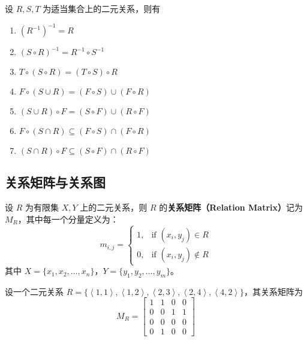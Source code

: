 \begin{proposition}
    设 $ R, S, T $ 为适当集合上的二元关系，则有
    \begin{enumerate}
        \item $ (R^{-1})^{-1} = R $
        \item $ (S\circ R)^{-1} = R^{-1}\circ S^{-1} $
        \item $ T\circ (S\circ R) = (T\circ S)\circ R $
        \item $ F\circ (S \cup R) = (F\circ S) \cup (F\circ R) $
        \item $ (S \cup R)\circ F = (S\circ F) \cup (R\circ F) $
        \item $ F\circ (S \cap R) \subseteq (F\circ S) \cap (F\circ R) $
        \item $ (S \cap R)\circ F \subseteq (S\circ F) \cap (R\circ F) $
    \end{enumerate}
\end{proposition}
\vspace{1em}

\subsection{关系矩阵与关系图}

\begin{definition}[关系矩阵]
    设 $ R $ 为有限集 $ X, Y $ 上的二元关系，则 $ R $ 的\textbf{关系矩阵（Relation Matrix）}记为 $ M_R $，其中每一个分量定义为：
    \[
        m_{i,j} = \begin{cases}
            1, & \text{if } (x_i,y_j)\in R \\
            0, & \text{if } (x_i,y_j)\notin R
        \end{cases}
    \]
    其中 $ X=\{x_1, x_2, \ldots, x_n\} $，$ Y=\{y_1, y_2, \ldots, y_m\} $。
\end{definition}

\begin{example}
    设一个二元关系 $ R=\{\left \langle1,1 \right \rangle,\left \langle1,2 \right \rangle,\left \langle2,3 \right \rangle,\left \langle2,4 \right \rangle,\left \langle4,2 \right \rangle\} $，其关系矩阵为
    \[
        M_R = \begin{bmatrix}
            1 & 1 & 0 & 0 \\
            0 & 0 & 1 & 1 \\
            0 & 0 & 0 & 0 \\
            0 & 1 & 0 & 0
        \end{bmatrix}
    \]
    \label{ex:relation_matrix}
\end{example}

